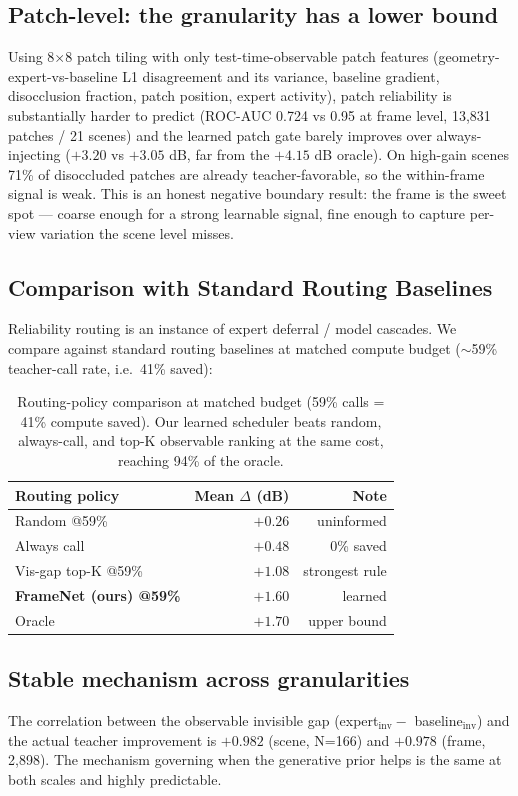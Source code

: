 \documentclass[10pt,twocolumn,letterpaper]{article}
\begin{document}
\subsection{Patch-level: the granularity has a lower bound}
Using 8$\times$8 patch tiling with only test-time-observable patch features
(geometry-expert-vs-baseline L1 disagreement and its variance, baseline
gradient, disocclusion fraction, patch position, expert activity), patch
reliability is substantially harder to predict (ROC-AUC 0.724 vs 0.95 at frame
level, 13{,}831 patches / 21 scenes) and the learned patch gate barely improves
over always-injecting ($+3.20$ vs $+3.05$ dB, far from the $+4.15$ dB oracle).
On high-gain scenes 71\% of disoccluded patches are already teacher-favorable, so
the within-frame signal is weak. This is an honest negative boundary result: the
frame is the sweet spot --- coarse enough for a strong learnable signal, fine
enough to capture per-view variation the scene level misses.

\subsection{Comparison with Standard Routing Baselines}
Reliability routing is an instance of expert deferral / model cascades. We
compare against standard routing baselines at matched compute budget ($\sim$59\%
teacher-call rate, i.e.\ 41\% saved):

\begin{table}[t]
\centering\small
\caption{Routing-policy comparison at matched budget (59\% calls = 41\% compute
saved). Our learned scheduler beats random, always-call, and top-K observable
ranking at the same cost, reaching 94\% of the oracle.}
\begin{tabular}{lrr}
\toprule
Routing policy & Mean $\Delta$ (dB) & Note \\
\midrule
Random @59\% & $+0.26$ & uninformed \\
Always call & $+0.48$ & 0\% saved \\
Vis-gap top-K @59\% & $+1.08$ & strongest rule \\
\textbf{FrameNet (ours) @59\%} & $\mathbf{+1.60}$ & learned \\
Oracle & $+1.70$ & upper bound \\
\bottomrule
\end{tabular}
\end{table}

\subsection{Stable mechanism across granularities}
The correlation between the observable invisible gap (expert$_{\text{inv}}-$
baseline$_{\text{inv}}$) and the actual teacher improvement is $+0.982$ (scene,
N=166) and $+0.978$ (frame, 2{,}898). The mechanism governing when the
generative prior helps is the same at both scales and highly predictable.
\end{document}
